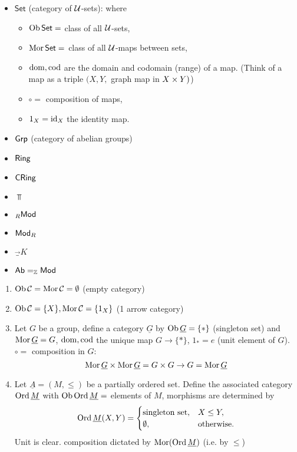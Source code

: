 \documentclass[a4paper]{report}
\begin{document}
\begin{exmps*}
  \begin{itemize}
    \item $\mathsf{Set}$ (category of $\mathcal{U}$-sets): where
          \begin{itemize}
          \item  $\operatorname{Ob} \mathsf{Set} = $ class of all $\mathcal{U}$-sets,
          \item  $\operatorname{Mor} \mathsf{Set} = $ class of all $\mathcal{U}$-maps between sets,
          \item  $\operatorname{dom}, \operatorname{cod}$ are the domain and codomain (range) of a map. (Think of a map as a triple $(X, Y, $ graph map in $X \times Y)$)
          \item  $\circ =$ composition of maps,
          \item $1_{X} = \operatorname{id}_{X}$ the identity map.
          \end{itemize}
    \item $\mathsf{Grp}$ (category of abelian groups)
          \item $\mathsf{Ring}$
          \item $\mathsf{CRing}$
    \item $\Top$
          \item $_{R}\mathsf{Mod}$
    \item $\mathsf{Mod}_{R}$
    \item $\Vec_{K}$
          \item $\mathsf{Ab} = _{\mathbb{Z}}\mathsf{Mod}$
  \end{itemize}
\end{exmps*}

\begin{exmps*}
\begin{enumerate}
  \item $\operatorname{Ob} \mathcal{C} = \operatorname{Mor} \mathcal{C} = \emptyset$ (empty category)
  \item $\operatorname{Ob} \mathcal{C} = \{X\}, \operatorname{Mor} \mathcal{C} = \{1_{X}\}$ (1 arrow category)
  \item Let $G$ be a group, define a category $\underline G$ by $\operatorname{Ob} \underline G = \{*\}$ (singleton set) and $\operatorname{Mor} \underline G = G$, $\operatorname{dom}, \operatorname{cod}$ the unique map $G \to \{*\}$, $1_{*} = e$ (unit element of $G$). $\circ =$ composition in $G$: \[\operatorname{Mor} \underline G \times \operatorname{Mor} \underline G = G \times G \to G = \operatorname{Mor} \underline G\]
        \item Let $\underline A = (M, \le)$ be a partially ordered set. Define the associated category $\operatorname{Ord} \underline M$ with $\operatorname{Ob} \operatorname{Ord} \underline M =$ elements of $M$, morphisms are determined by \[\operatorname{Ord} \underline M(X,Y) = \begin{cases}\text{singleton set}, & X \le Y, \\ \emptyset , & \text{otherwise.}
        \end{cases}\]
        Unit is clear. composition dictated by $\operatorname{Mor}(\operatorname{Ord} \underline M)$ (i.e. by $\le$)
\end{enumerate}
\end{exmps*}
\end{document}
